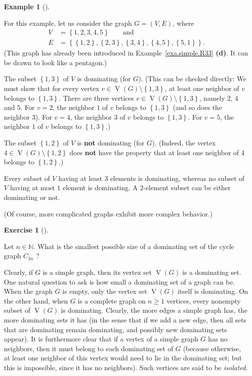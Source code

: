 \documentclass[numbers=enddot,12pt,final,onecolumn,notitlepage]{scrartcl}%
\theoremstyle{definition}
\newtheorem{exam}[theo]{Example}
\newenvironment{example}[1][]
{\begin{exam}[#1]\begin{leftbar}}
{\end{leftbar}\end{exam}}
\newtheorem{exmp}[theo]{Exercise}
\newenvironment{exercise}[1][]
{\begin{exmp}[#1]\begin{leftbar}}
{\end{leftbar}\end{exmp}}
\newcommand{\NN}{\mathbb{N}}
\newcommand{\set}[1]{\left\{ #1 \right\}}
\newcommand{\tup}[1]{\left( #1 \right)}
\newcommand{\verts}[1]{\operatorname{V}\left( #1 \right)}
\begin{document}
\begin{example}
For this example, let us consider the graph $G = \tup{V, E}$, where
\begin{align*}
V &= \set{1, 2, 3, 4, 5} \qquad \text{and} \\
E &= \set{\set{1,2}, \set{2,3}, \set{3,4}, \set{4,5}, \set{5,1}} .
\end{align*}
(This graph has already been introduced in
Example~\ref{exa.simple.R33} \textbf{(d)}. It can be drawn to look
like a pentagon.)

The subset $\set{1, 3}$ of $V$ is dominating (for $G$). (This can be
checked directly: We must show that
for every vertex $v \in \verts{G} \setminus \set{1, 3}$, at least
one neighbor of $v$ belongs to $\set{1, 3}$. There are three vertices
$v \in \verts{G} \setminus \set{1, 3}$, namely $2$, $4$ and $5$. For
$v = 2$, the neighbor $1$ of $v$ belongs to $\set{1, 3}$ (and so does
the neighbor $3$). For $v = 4$, the neighbor $3$ of $v$ belongs to
$\set{1, 3}$. For $v = 5$, the neighbor $1$ of $v$ belongs to
$\set{1, 3}$.)

The subset $\set{1, 2}$ of $V$ is \textbf{not} dominating (for $G$).
(Indeed, the vertex $4 \in \verts{G} \setminus \set{1, 2}$ does
\textbf{not} have the property that at least one neighbor of $4$
belongs to $\set{1, 2}$.)

Every subset of $V$ having at least $3$ elements is dominating,
whereas no subset of $V$ having at most $1$ element is dominating.
A $2$-element subset can be either dominating or not.

(Of course, more complicated graphs exhibit more complex behavior.)
\end{example}

\begin{exercise}
Let $n \in \NN$. What is the smallest possible size of a dominating
set of the cycle graph $C_{3n}$ ?
\end{exercise}

Clearly, if $G$ is a simple graph, then its vertex set $\verts{G}$ is
a dominating set.
One natural question to ask is how small a dominating set of a graph
can be. When the graph $G$ is empty, only the vertex set $\verts{G}$
itself is dominating. On the other hand, when $G$ is a complete graph
on $n \geq 1$ vertices, every nonempty subset of $\verts{G}$ is
dominating. Clearly, the more edges a simple graph has, the more
dominating sets it has (in the sense that if we add a new edge, then
all sets that are dominating remain dominating, and possibly new
dominating sets appear). It is furthermore clear that if a vertex of
a simple graph $G$ has no neighbors, then it must belong to each
dominating set of $G$ (because otherwise, at least one neighbor of
this vertex would need to lie in the dominating set; but this is
impossible, since it has no neighbors). Such vertices are said to be
\textit{isolated}.
\end{document}
